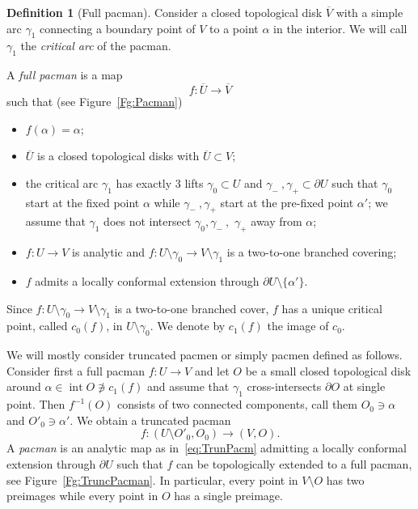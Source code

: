 \documentclass[]{amsart}
\newcommand\intr{\operatorname{int}}
\theoremstyle{remark}
\numberwithin{equation}{section}
\theoremstyle{definition}
\newtheorem{defn}[thm]{Definition}
\begin{document}
\begin{defn}[Full pacman]
\label{dfn:Pacman}
Consider a closed topological disk $\overline{V}$ with a simple arc  $\gamma_1$ connecting a boundary point of $V$ to a point $\alpha$ in the interior. We will call $\gamma_1$ the \emph{critical arc} of the pacman.


A \emph{full pacman} is a map \[f:\overline{U}
\to \overline{V}\] such that (see  Figure~\ref{Fg:Pacman})
\begin{itemize}
\item $f(\alpha)=\alpha$;
\item   $\overline{U}$ is a closed topological disks with $\overline{U}\subset V$;

\item the critical arc $\gamma_1$ has exactly $3$ lifts $\gamma_0\subset U$ and $\gamma_-~,\gamma_+ \subset \partial U$ such that $\gamma_0$   start at the fixed point $\alpha$ while $\gamma_-~,\gamma_+$ start at the pre-fixed point $\alpha'$; we assume that $\gamma_1$ does not intersect $\gamma_0,\gamma_-~,$  $\gamma_+$ away from $\alpha$;
\item $f:U\to V$ is analytic and $f:U\setminus \gamma_0\to V\setminus \gamma_1$ is a two-to-one branched covering;  
\item $f$ admits a locally conformal extension through $\partial U\setminus \{\alpha'\}$.
\end{itemize}
\end{defn}


Since $f:U\setminus \gamma_0\to V\setminus \gamma_1$ is a two-to-one branched cover, $f$ has a unique critical point, called $c_0(f)$, in $U\setminus \gamma_0$. We denote by $c_1(f)$ the image of $c_0$.

 


We will mostly consider  truncated pacmen or simply pacmen defined as follows. Consider first a full pacman $f\colon U\to V$ and let $O$ be a small closed topological disk around $\alpha \in \intr O\not\ni c_1(f)$ and assume that $\gamma_1$ cross-intersects $\partial O$ at single point. Then $f^{-1}(O)$ consists of two connected components, call them $ O_0\ni \alpha$ and $O'_0\ni \alpha'$. We obtain a truncated pacman
\begin{equation}
\label{eq:TrunPacm}
f\colon (U\setminus O'_0, O_0)\to (V,O).
\end{equation}
 A \emph{pacman} is an analytic map as in~\eqref{eq:TrunPacm} admitting a locally conformal extension through $\partial U$ such that $f$ can be topologically extended to a full pacman, see Figure~\ref{Fg:TruncPacman}. In particular, every point in $V\setminus O$ has two preimages while every point in $O$ has a single preimage. 
\end{document}
